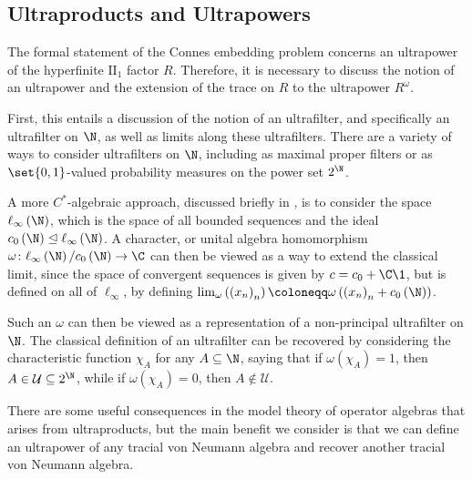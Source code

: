 \documentclass[10pt]{mypackage}
\renewcommand{\coloneq}{\coloneqq}
\begin{document}
\subsection{Ultraproducts and Ultrapowers}%
The formal statement of the Connes embedding problem concerns an ultrapower of the hyperfinite $\text{II}_1$ factor $R$. Therefore, it is necessary to discuss the notion of an ultrapower and the extension of the trace on $R$ to the ultrapower $R^{\omega}$.

First, this entails a discussion of the notion of an ultrafilter, and specifically an ultrafilter on $\N$, as well as limits along these ultrafilters. There are a variety of ways to consider ultrafilters on $\N$, including as maximal proper filters or as $\set{0,1}$-valued probability measures on the power set $2^{\N}$.

A more $C^{\ast}$-algebraic approach, discussed briefly in \cite[Section 2.5]{hayes2021propertytstrong1boundedness}, is to consider the space $\ell_{\infty}\left( \N \right)$, which is the space of all bounded sequences and the ideal $c_0\left( \N \right)\trianglelefteq \ell_{\infty}\left( \N \right)$. A character, or unital algebra homomorphism $\omega\colon \ell_{\infty}\left( \N \right)/c_0\left( \N \right)\rightarrow \C$ can then be viewed as a way to extend the classical limit, since the space of convergent sequences is given by $c = c_0 + \C \1$, but is defined on all of $\ell_{\infty}$, by defining $\lim_{\omega}\left( \left( x_n \right)_n \right)\coloneq \omega\left( \left( x_n \right)_n + c_0\left( \N \right) \right)$.

Such an $\omega$ can then be viewed as a representation of a non-principal ultrafilter on $\N$. The classical definition of an ultrafilter can be recovered by considering the characteristic function $\chi_{A}$ for any $A\subseteq \N$, saying that if $\omega\left( \chi_A \right) = 1$, then $A\in \mathcal{U}\subseteq 2^{\N}$, while if $\omega\left( \chi_A \right) = 0$, then $A\notin \mathcal{U}$.

There are some useful consequences in the model theory of operator algebras that arises from ultraproducts, but the main benefit we consider is that we can define an ultrapower of any tracial von Neumann algebra and recover another tracial von Neumann algebra.
\end{document}

